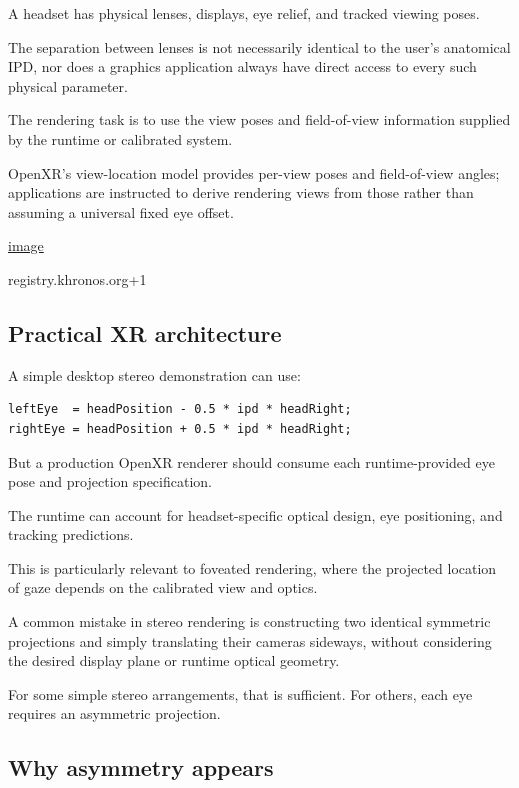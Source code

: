 A headset has physical lenses, displays, eye relief, and tracked viewing poses.

The separation between lenses is not necessarily identical to the user's anatomical IPD, nor does a graphics application always have direct access to every such physical parameter.

The rendering task is to use the view poses and field-of-view information supplied by the runtime or calibrated system.

OpenXR's view-location model provides per-view poses and field-of-view angles; applications are instructed to derive rendering views from those rather than assuming a universal fixed eye offset. 

\href{https://www.google.com/s2/favicons?domain=https://registry.khronos.org&sz=32}{image}

registry.khronos.org+1

\subsection{Practical XR architecture}\label{02-foundations-ii-ch035-practical-xr-architecture}

A simple desktop stereo demonstration can use:

\begin{verbatim}
leftEye  = headPosition - 0.5 * ipd * headRight;
rightEye = headPosition + 0.5 * ipd * headRight;
\end{verbatim}

But a production OpenXR renderer should consume each runtime-provided eye pose and projection specification.

The runtime can account for headset-specific optical design, eye positioning, and tracking predictions.

This is particularly relevant to foveated rendering, where the projected location of gaze depends on the calibrated view and optics.

A common mistake in stereo rendering is constructing two identical symmetric projections and simply translating their cameras sideways, without considering the desired display plane or runtime optical geometry.

For some simple stereo arrangements, that is sufficient. For others, each eye requires an asymmetric projection.

\subsection{Why asymmetry appears}\label{02-foundations-ii-ch035-why-asymmetry-appears}

